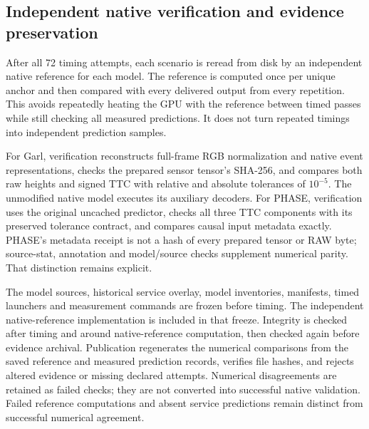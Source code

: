 \begin{table}[H]
\centering\small
\caption{\textbf{Age of Garl's latest declared RGB endpoint.} Statistics use the independent native reference at every valid anchor, including anchors for which a timed service did not return a TTC. RGB pairs count distinct endpoint identities.}

\end{table}

\subsection{Independent native verification and evidence preservation}

After all 72 timing attempts, each scenario is reread from disk by an independent native reference for each model. The reference is computed once per unique anchor and then compared with every delivered output from every repetition. This avoids repeatedly heating the GPU with the reference between timed passes while still checking all measured predictions. It does not turn repeated timings into independent prediction samples.

For Garl, verification reconstructs full-frame RGB normalization and native event representations, checks the prepared sensor tensor's SHA-256, and compares both raw heights and signed TTC with relative and absolute tolerances of $10^{-5}$. The unmodified native model executes its auxiliary decoders. For PHASE, verification uses the original uncached predictor, checks all three TTC components with its preserved tolerance contract, and compares causal input metadata exactly. PHASE's metadata receipt is not a hash of every prepared tensor or RAW byte; source-stat, annotation and model/source checks supplement numerical parity. That distinction remains explicit.

The model sources, historical service overlay, model inventories, manifests, timed launchers and measurement commands are frozen before timing. The independent native-reference implementation is included in that freeze. Integrity is checked after timing and around native-reference computation, then checked again before evidence archival. Publication regenerates the numerical comparisons from the saved reference and measured prediction records, verifies file hashes, and rejects altered evidence or missing declared attempts. Numerical disagreements are retained as failed checks; they are not converted into successful native validation. Failed reference computations and absent service predictions remain distinct from successful numerical agreement.

